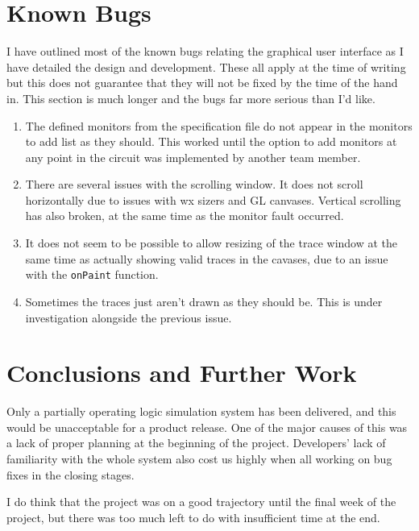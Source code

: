 \documentclass[a4paper,10pt]{article}  %
\begin{document}
\section{Known Bugs}
\label{sec:known-bugs}

I have outlined most of the known bugs relating the graphical user
interface as I have detailed the design and development. These all
apply at the time of writing but this does not guarantee that they
will not be fixed by the time of the hand in. This section is much
longer and the bugs far more serious than I'd like.
\begin{enumerate}
\item The defined monitors from the specification file do not appear
  in the monitors to add list as they should. This worked until the
  option to add monitors at any point in the circuit was implemented
  by another team member.
\item There are several issues with the scrolling window. It does not
  scroll horizontally due to issues with wx sizers and GL
  canvases. Vertical scrolling has also broken, at the same time as
  the monitor fault occurred.
\item It does not seem to be possible to allow resizing of the trace
  window at the same time as actually showing valid traces in the
  cavases, due to an issue with the \texttt{onPaint} function.
\item Sometimes the traces just aren't drawn as they should be. This
  is under investigation alongside the previous issue.
\end{enumerate}


\section{Conclusions and Further Work}
\label{sec:concl-furth-work}

Only a partially operating logic simulation system has been delivered,
and this would be unacceptable for a product release. One of the major
causes of this was a lack of proper planning at the beginning of the
project. Developers' lack of familiarity with the whole system also
cost us highly when all working on bug fixes in the closing stages.

I do think that the project was on a good trajectory until the final
week of the project, but there was too much left to do with
insufficient time at the end.
\end{document}
